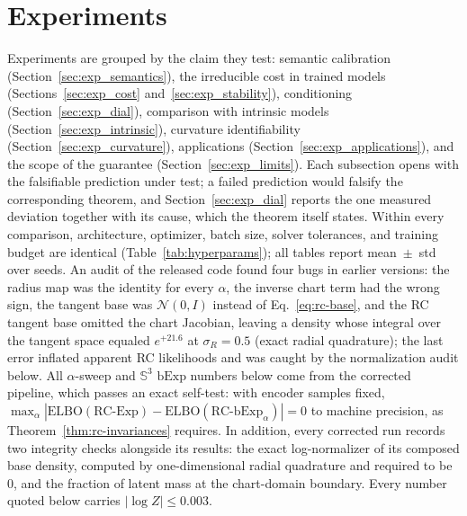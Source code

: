 \documentclass{article}
\theoremstyle{definition}
\theoremstyle{remark}
\newcommand{\bExp}{\mathrm{bExp}}
\newcommand{\SSS}{\mathbb{S}}
\begin{document}


\section{Experiments}
\label{sec:experiments}

Experiments are grouped by the claim they test: semantic calibration (Section~\ref{sec:exp_semantics}), the irreducible cost in trained models (Sections~\ref{sec:exp_cost} and~\ref{sec:exp_stability}), conditioning (Section~\ref{sec:exp_dial}), comparison with intrinsic models (Section~\ref{sec:exp_intrinsic}), curvature identifiability (Section~\ref{sec:exp_curvature}), applications (Section~\ref{sec:exp_applications}), and the scope of the guarantee (Section~\ref{sec:exp_limits}). Each subsection opens with the falsifiable prediction under test; a failed prediction would falsify the corresponding theorem, and Section~\ref{sec:exp_dial} reports the one measured deviation together with its cause, which the theorem itself states. Within every comparison, architecture, optimizer, batch size, solver tolerances, and training budget are identical (Table~\ref{tab:hyperparams}); all tables report mean~$\pm$~std over seeds. An audit of the released code found four bugs in earlier versions: the radius map was the identity for every $\alpha$, the inverse chart term had the wrong sign, the tangent base was $\mathcal N(0,I)$ instead of Eq.~\eqref{eq:rc-base}, and the RC tangent base omitted the chart Jacobian, leaving a density whose integral over the tangent space equaled $e^{+21.6}$ at $\sigma_R{=}0.5$ (exact radial quadrature); the last error inflated apparent RC likelihoods and was caught by the normalization audit below. All $\alpha$-sweep and $\SSS^3$ $\bExp$ numbers below come from the corrected pipeline, which passes an exact self-test: with encoder samples fixed, $\max_\alpha|\mathrm{ELBO}(\text{RC-Exp})-\mathrm{ELBO}(\text{RC-bExp}_\alpha)|=0$ to machine precision, as Theorem~\ref{thm:rc-invariances} requires. In addition, every corrected run records two integrity checks alongside its results: the exact log-normalizer of its composed base density, computed by one-dimensional radial quadrature and required to be $0$, and the fraction of latent mass at the chart-domain boundary. Every number quoted below carries $|\log Z|\le0.003$.
\end{document}
